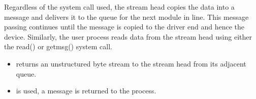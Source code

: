 Regardless of the system call used, the stream head copies the data into a message and delivers it to the queue for the next module in line.
This message passing continues until the message is copied to the driver end and hence the device.
Similarly, the user process reads data from the stream head using either the read() or getmsg() system call.
\begin{itemize}[noitemsep]
\item {} returns an unstructured byte stream to the stream head from its adjacent queue.
\item {} is used, a message is returned to the process.
\end{itemize}


